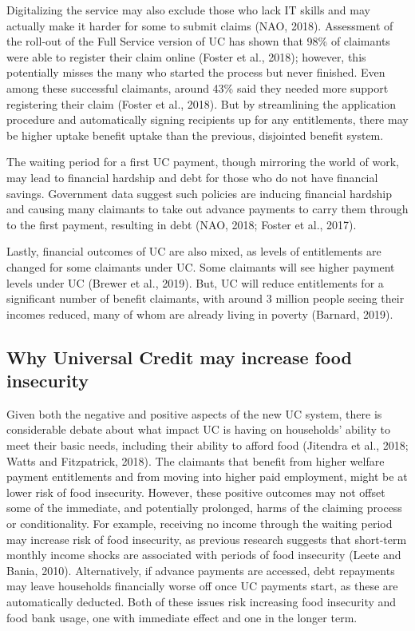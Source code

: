 \documentclass[12pt,article,oneside]{memoir}
\begin{document}
Digitalizing the service may also exclude those who lack IT skills and may actually make it harder for some to submit claims (NAO, 2018). Assessment of the roll-out of the Full Service version of UC has shown that 98\% of claimants were able to register their claim online (Foster et al., 2018); however, this potentially misses the many who started the process but never finished. Even among these successful claimants, around 43\% said they needed more support registering their claim (Foster et al., 2018). But by streamlining the application procedure and automatically signing recipients up for any entitlements, there may be higher uptake benefit uptake than the previous, disjointed benefit system.

The waiting period for a first UC payment, though mirroring the world of work, may lead to financial hardship and debt for those who do not have financial savings. Government data suggest such policies are inducing financial hardship and causing many claimants to take out advance payments to carry them through to the first payment, resulting in debt (NAO, 2018; Foster et al., 2017). 

Lastly, financial outcomes of UC are also mixed, as levels of entitlements are changed for some claimants under UC. Some claimants will see higher payment levels under UC (Brewer et al., 2019). But, UC will reduce entitlements for a significant number of benefit claimants, with around 3 million people seeing their incomes reduced, many of whom are already living in poverty (Barnard, 2019).


\subsection*{Why Universal Credit may increase food insecurity}

Given both the negative and positive aspects of the new UC system, there is considerable debate about what impact UC is having on households’ ability to meet their basic needs, including their ability to afford food (Jitendra et al., 2018; Watts and Fitzpatrick, 2018). The claimants that benefit from higher welfare payment entitlements and from moving into higher paid employment, might be at lower risk of food insecurity. However, these positive outcomes may not offset some of the immediate, and potentially prolonged, harms of the claiming process or conditionality. For example, receiving no income through the waiting period may increase risk of food insecurity, as previous research suggests that short-term monthly income shocks are associated with periods of food insecurity (Leete and Bania, 2010). Alternatively, if advance payments are accessed, debt repayments may leave households financially worse off once UC payments start, as these are automatically deducted. Both of these issues risk increasing food insecurity and food bank usage, one with immediate effect and one in the longer term. 
\end{document}
